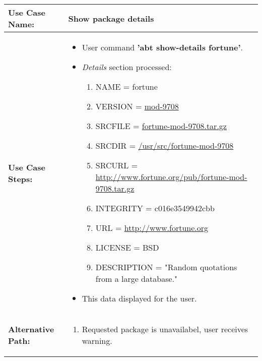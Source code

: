 \medskip

\begin{tabularx}{\linewidth}{|l|X|}
\hline
\textbf{Use Case Name:} & \textbf{Show package details} \\
\hline
\textbf{Use Case Steps:} & 
\begin{minipage}{\linewidth} 
  \vspace{0.05em}
  \begin{itemize}
    \item User command \textbf{'abt show-details fortune'}.
    \item \emph{Details} section processed:
    \begin{enumerate}
      \item NAME = fortune
      \item VERSION = \url{mod-9708}
      \item SRCFILE = \url{fortune-mod-9708.tar.gz}
      \item SRCDIR = \url{/usr/src/fortune-mod-9708}
      \item SRCURL = \url{http://www.fortune.org/pub/fortune-mod-9708.tar.gz}
      \item INTEGRITY = c016e3549942cbb
      \item URL = \url{http://www.fortune.org}
      \item LICENSE = BSD
      \item DESCRIPTION = "Random quotations from a large database."
    \end{enumerate}
    \item This data displayed for the user.
  \end{itemize}
  \vspace{0.05em}
\end{minipage}
\\
\hline 
\textbf{Alternative Path:} &
\begin{minipage}{\linewidth}
  \vspace{0.05em} 
  \begin{enumerate}
    \item Requested package is unavailabel, user receives warning.
  \end{enumerate}
  \vspace{0.05em} 
\end{minipage}
\\
\hline
\end{tabularx}

\newpage


